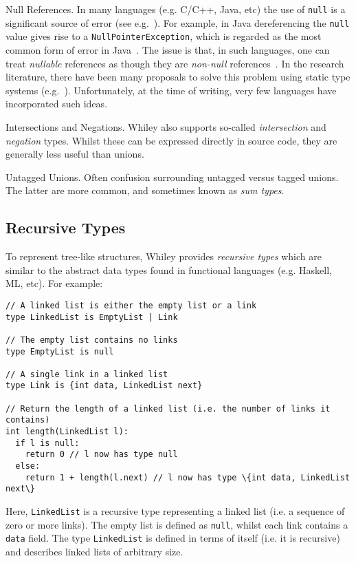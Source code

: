 \begin{insight}{Null References.}  In many languages (e.g. C/C++,
  Java, etc) the use of \lstinline{null} is a significant source of
  error (see e.g.~\cite{Hoa09}).  For example, in Java dereferencing
  the \lstinline{null} value gives rise to a
  \lstinline{NullPointerException}, which is regarded as the most
  common form of error in Java~\cite{XYZ}.  The issue is that, in such
  languages, one can treat {\em nullable} references as though they
  are {\em non-null} references~\cite{Pier02}.  In the research
  literature, there have been many proposals to solve this problem
  using static type systems
  (e.g.~\cite{PQVHV01,FL03,KH07,CFJJ06,CJ07,MPPD08,Hub08,HJP08}).
  Unfortunately, at the time of writing, very few languages have
  incorporated such ideas.
\end{insight}

\begin{insight}{Intersections and Negations.}
  Whiley also supports so-called {\em intersection} and {\em negation}
  types.  Whilst these can be expressed directly in source code, they
  are generally less useful than unions.
\end{insight}

\begin{insight}{Untagged Unions}.  Often confusion surrounding untagged
    versus tagged unions.  The latter are more common, and sometimes
    known as {\em sum types}.
\end{insight}

\subsection{Recursive Types}
To represent tree-like structures, Whiley provides {\em recursive
  types} which are similar to the abstract data types found in
functional languages (e.g. Haskell, ML, etc).  For example:
\begin{lstlisting}
// A linked list is either the empty list or a link
type LinkedList is EmptyList | Link

// The empty list contains no links
type EmptyList is null

// A single link in a linked list
type Link is {int data, LinkedList next}

// Return the length of a linked list (i.e. the number of links it contains)
int length(LinkedList l):
  if l is null:    
    return 0 // l now has type null
  else:    
    return 1 + length(l.next) // l now has type \{int data, LinkedList next\}
\end{lstlisting}
Here, \lstinline{LinkedList} is a recursive type representing a linked
list (i.e. a sequence of zero or more links).  The empty list is
defined as \lstinline{null}, whilst each link contains a
\lstinline{data} field.  The type \lstinline{LinkedList} is defined in
terms of itself (i.e. it is recursive) and describes linked lists of
arbitrary size.

